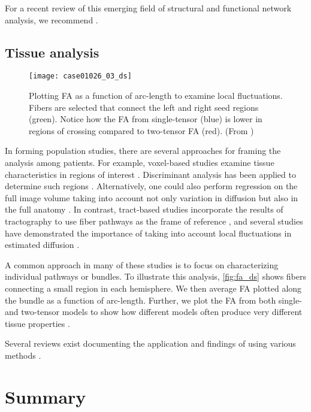 \documentclass[final,hyperref]{gatech-thesis}
\begin{document}
For a recent review of this emerging field of structural and functional
network analysis, we recommend \cite{Bullmore2009}.






\subsection{Tissue analysis}

\begin{figure}[t]
  \centering
  \texttt{[image: case01026\_03\_ds]}
  \caption{Plotting FA as a function of arc-length to examine local
    fluctuations.  Fibers are selected that connect the left and right seed
    regions (green).  Notice how the FA from single-tensor (blue) is lower in
    regions of crossing compared to two-tensor FA (red).  (From \cite{Malcolm2009study})}
  \label{fig:fa_ds}
\end{figure}
In forming population studies, there are several approaches for framing the
analysis among patients.
%
For example, voxel-based studies examine tissue characteristics in regions of
interest \cite{Ashburner2000}.  Discriminant analysis has been applied to
determine such regions \cite{Caan2006}.  Alternatively, one could also perform
regression on the full image volume taking into account not only variation in
diffusion but also in the full anatomy \cite{Rohlfing2009}.
%
In contrast, tract-based studies incorporate the results of tractography to
use fiber pathways as the frame of reference \cite{Ding2003,Smith2006}, and
several studies have demonstrated the importance of taking into account local
fluctuations in estimated diffusion
\cite{Corouge2006,ODonnell2009,Maddah2008media,Goodlett2009,Yushkevich2008}.

A common approach in many of these studies is to focus on characterizing
individual pathways or bundles.  To illustrate this analysis, \autoref{fig:fa_ds}
shows fibers connecting a small region in each hemisphere.  We then average FA
plotted along the bundle as a function of arc-length.  Further, we plot the FA
from both single- and two-tensor models to show how different models often
produce very different tissue properties \cite{Malcolm2009study}.

Several reviews exist documenting the application and findings of using
various methods \cite{Lim2002,Horsfield2002,Kubicki2007}.


\section{Summary}
\end{document}

